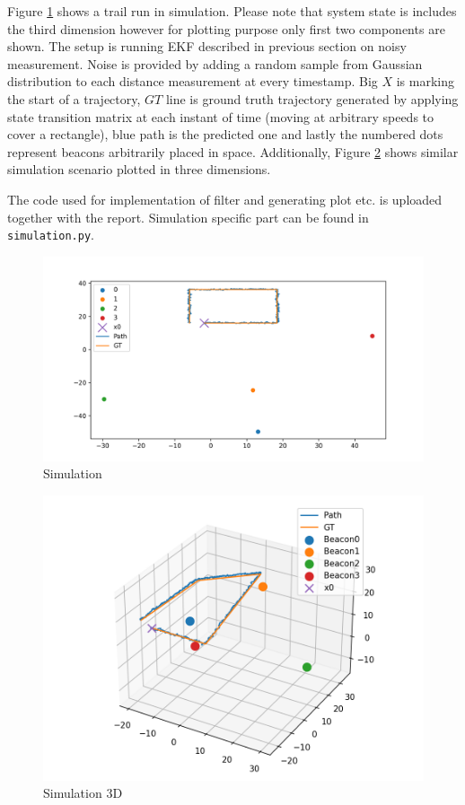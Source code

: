 Figure \ref{fig:sim} shows a trail run in simulation. Please note that system state is includes the third dimension however for plotting purpose only first two components are shown. The setup is running EKF described in previous section on noisy measurement. Noise is provided by adding a random sample from Gaussian distribution to each distance measurement at every timestamp. Big $X$ is marking the start of a trajectory, $GT$ line is ground truth trajectory generated by applying state transition matrix at each instant of time (moving at arbitrary speeds to cover a rectangle), blue path is the predicted one and lastly the numbered dots represent beacons arbitrarily placed in space. Additionally, Figure \ref{fig:sim_3d} shows similar simulation scenario plotted in three dimensions.

The code used for implementation of filter and generating plot etc. is uploaded together with the report. Simulation specific part can be found in \verb+simulation.py+.

\begin{figure}[H]
    \centering
    \includegraphics[width=.75\linewidth]{figures/sim.png}
    \caption{Simulation}
    \label{fig:sim}
\end{figure}

\begin{figure}[H]
    \centering
    \includegraphics[width=.75\linewidth]{figures/sim_3d_path.png}
    \caption{Simulation 3D}
    \label{fig:sim_3d}
\end{figure}